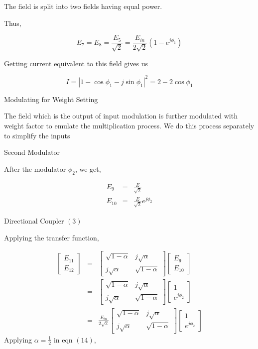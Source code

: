The field is split into two fields having equal power.

Thus,

$$
E_{7} = E_{8} = \frac{E_{5}}{\sqrt{ 2 }} = \frac{E_{in}}{2\sqrt{ 2 }}(1-e^{j\phi_{1}})
$$

Getting current equivalent to this field gives us

$$
I = |1 - \cos\phi_{1} - j \sin\phi_{1}|^2 =  2 - 2 \cos\phi_{1}
$$

 Modulating for Weight Setting

The field which is the output of input modulation is further modulated with weight factor to emulate the multiplication process.  We do this process separately to simplify the inputs

 Second Modulator

After the modulator $\phi_{2}$, we get,

$$
\begin{aligned}
E_{9} &=&  \frac{E}{\sqrt{ 2 }} \\
E_{10} &=& \frac{E}{\sqrt{ 2 }}e^{j\phi_{2}}
\end{aligned}
$$

 Directional Coupler $(3)$

Applying the transfer function,

$$
\begin{aligned}
\begin{bmatrix}
E_{11} \\ E_{12}
\end{bmatrix} &=& \begin{bmatrix}
\sqrt{ 1-\alpha } & j\sqrt{ \alpha } \\
j\sqrt{ \alpha } & \sqrt{ 1-\alpha }
\end{bmatrix}\begin{bmatrix}
E_{9} \\
E_{10} 
\end{bmatrix}\\
&=& \begin{bmatrix}
\sqrt{ 1-\alpha } & j\sqrt{ \alpha } \\
j\sqrt{ \alpha } & \sqrt{ 1-\alpha }
\end{bmatrix} \begin{bmatrix}
1 \\
e^{j\phi_{2}}
\end{bmatrix}\\
&=& \frac{E_{in}}{2\sqrt{ 2 }}\begin{bmatrix}
\sqrt{ 1-\alpha } & j\sqrt{ \alpha } \\
j\sqrt{ \alpha } & \sqrt{ 1-\alpha }
\end{bmatrix} \begin{bmatrix}
1 \\
e^{j\phi_{2}}
\end{bmatrix}
\end{aligned}
$$
Applying $\alpha = \frac{1}{2}$ in eqn $(14)$,

